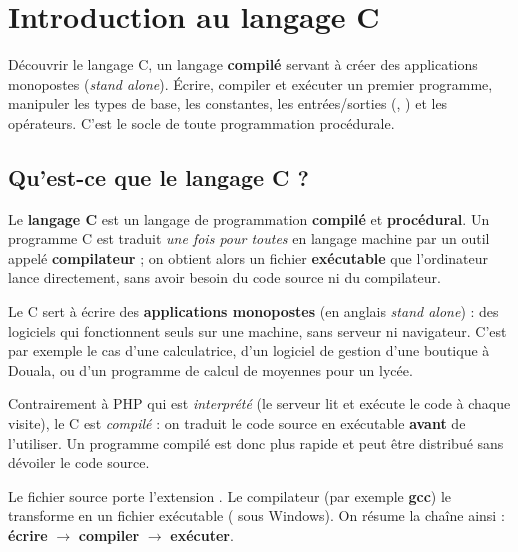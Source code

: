 \chapter{Introduction au langage C}

\begin{synthese}[Au programme]
Découvrir le langage C, un langage \textbf{compilé} servant à créer des
applications monopostes (\emph{stand alone}). Écrire, compiler et exécuter un
premier programme, manipuler les types de base, les constantes, les
entrées/sorties (, ) et les opérateurs. C'est le socle
de toute programmation procédurale.
\end{synthese}

\section{Qu'est-ce que le langage C ?}

\begin{definition}
Le \textbf{langage C} est un langage de programmation \textbf{compilé} et
\textbf{procédural}. Un programme C est traduit \emph{une fois pour toutes} en
langage machine par un outil appelé \textbf{compilateur} ; on obtient alors un
fichier \textbf{exécutable} que l'ordinateur lance directement, sans avoir besoin
du code source ni du compilateur.
\end{definition}

Le C sert à écrire des \textbf{applications monopostes} (en anglais
\emph{stand alone}) : des logiciels qui fonctionnent seuls sur une machine, sans
serveur ni navigateur. C'est par exemple le cas d'une calculatrice, d'un logiciel
de gestion d'une boutique à Douala, ou d'un programme de calcul de moyennes pour
un lycée.

\begin{remarque}
Contrairement à PHP qui est \emph{interprété} (le serveur lit et exécute le code à
chaque visite), le C est \emph{compilé} : on traduit le code source en exécutable
\textbf{avant} de l'utiliser. Un programme compilé est donc plus rapide et peut
être distribué sans dévoiler le code source.
\end{remarque}

\begin{propriete}
Le fichier source porte l'extension . Le compilateur (par exemple
\textbf{gcc}) le transforme en un fichier exécutable ( sous Windows).
On résume la chaîne ainsi : \textbf{écrire} $\rightarrow$ \textbf{compiler}
$\rightarrow$ \textbf{exécuter}.
\end{propriete}

